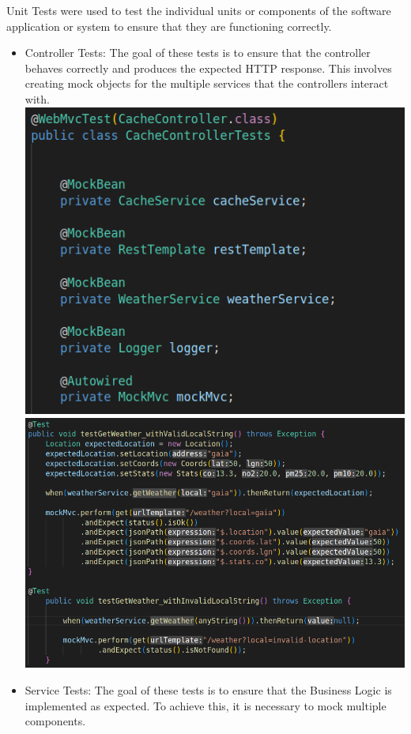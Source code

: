 \documentclass[12pt]{article}
\begin{document}
Unit Tests were used to test the individual units or components of the software application or system to ensure that they are functioning correctly. 
\begin{itemize}
\item Controller Tests: The goal of these tests is to ensure that the controller behaves correctly and produces the expected HTTP response. This involves creating mock objects for the multiple services that the controllers interact with.
\includegraphics[scale=0.5]{ControllerMocks.png}
\\
\includegraphics[scale=0.45]{ControllerExample.png}
\item Service Tests: The goal of these tests is to ensure that the Business Logic is implemented as expected. To achieve this, it is necessary to mock multiple components.

\end{itemize}
\end{document}
